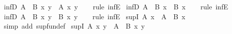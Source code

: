 \begin{isabellebody}
{\isafoldproof}%
%
\isadelimproof
\isanewline
%
\endisadelimproof
\isanewline
{}\isamarkupfalse%
\ inf{}D{}{\isacharcolon}{\kern0pt}\ {\isachardoublequoteopen}{\isacharparenleft}{\kern0pt}A\ {\isasymsqinter}\ B{\isacharparenright}{\kern0pt}\ x\ y\ {\isasymLongrightarrow}\ A\ x\ y{\isachardoublequoteclose}\isanewline
%
\isadelimproof
\ \ %
\endisadelimproof
%
\isatagproof
{}\isamarkupfalse%
\ {\isacharparenleft}{\kern0pt}rule\ inf{}E{\isacharparenright}{\kern0pt}%
\endisatagproof
{\isafoldproof}%
%
\isadelimproof
\isanewline
%
\endisadelimproof
\isanewline
{}\isamarkupfalse%
\ inf{}D{}{\isacharcolon}{\kern0pt}\ {\isachardoublequoteopen}{\isacharparenleft}{\kern0pt}A\ {\isasymsqinter}\ B{\isacharparenright}{\kern0pt}\ x\ {\isasymLongrightarrow}\ B\ x{\isachardoublequoteclose}\isanewline
%
\isadelimproof
\ \ %
\endisadelimproof
%
\isatagproof
{}\isamarkupfalse%
\ {\isacharparenleft}{\kern0pt}rule\ inf{}E{\isacharparenright}{\kern0pt}%
\endisatagproof
{\isafoldproof}%
%
\isadelimproof
\isanewline
%
\endisadelimproof
\isanewline
{}\isamarkupfalse%
\ inf{}D{}{\isacharcolon}{\kern0pt}\ {\isachardoublequoteopen}{\isacharparenleft}{\kern0pt}A\ {\isasymsqinter}\ B{\isacharparenright}{\kern0pt}\ x\ y\ {\isasymLongrightarrow}\ B\ x\ y{\isachardoublequoteclose}\isanewline
%
\isadelimproof
\ \ %
\endisadelimproof
%
\isatagproof
{}\isamarkupfalse%
\ {\isacharparenleft}{\kern0pt}rule\ inf{}E{\isacharparenright}{\kern0pt}%
\endisatagproof
{\isafoldproof}%
%
\isadelimproof
\isanewline
%
\endisadelimproof
\isanewline
{}\isamarkupfalse%
\ sup{}I{}{\isacharcolon}{\kern0pt}\ {\isachardoublequoteopen}A\ x\ {\isasymLongrightarrow}\ {\isacharparenleft}{\kern0pt}A\ {\isasymsqunion}\ B{\isacharparenright}{\kern0pt}\ x{\isachardoublequoteclose}\isanewline
%
\isadelimproof
\ \ %
\endisadelimproof
%
\isatagproof
{}\isamarkupfalse%
\ {\isacharparenleft}{\kern0pt}simp\ add{\isacharcolon}{\kern0pt}\ sup{\isacharunderscore}{\kern0pt}fun{\isacharunderscore}{\kern0pt}def{\isacharparenright}{\kern0pt}%
\endisatagproof
{\isafoldproof}%
%
\isadelimproof
\isanewline
%
\endisadelimproof
\isanewline
{}\isamarkupfalse%
\ sup{}I{}{\isacharcolon}{\kern0pt}\ {\isachardoublequoteopen}A\ x\ y\ {\isasymLongrightarrow}\ {\isacharparenleft}{\kern0pt}A\ {\isasymsqunion}\ B{\isacharparenright}{\kern0pt}\ x\ y{\isachardoublequoteclose}\isanewline

\end{isabellebody}
